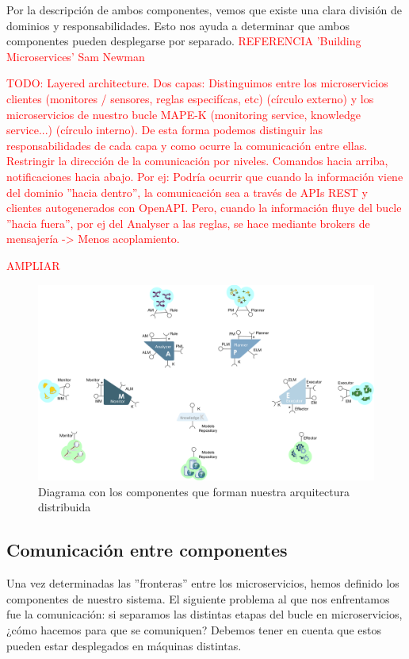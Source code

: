 Por la descripción de ambos componentes, vemos que existe una clara división de dominios y responsabilidades. Esto nos ayuda a determinar que ambos componentes pueden desplegarse por separado. \textcolor{red}{REFERENCIA 'Building Microservices' Sam Newman}

\textcolor{red}{TODO: Layered architecture. Dos capas: Distinguimos entre los microservicios clientes (monitores / sensores, reglas especifícas, etc) (círculo externo) y los microservicios de nuestro bucle MAPE-K (monitoring service, knowledge service...) (círculo interno). De esta forma podemos distinguir las responsabilidades de cada capa y como ocurre la comunicación entre ellas. Restringir la dirección de la comunicación por niveles. Comandos hacia arriba, notificaciones hacia abajo. Por ej: Podría ocurrir que cuando la información viene del dominio ''hacia dentro'', la comunicación sea a través de APIs REST y clientes autogenerados con OpenAPI. Pero, cuando la información fluye del bucle ''hacia fuera'', por ej del Analyser a las reglas, se hace mediante brokers de mensajería -> Menos acoplamiento.}

\textcolor{red}{AMPLIAR}

\begin{figure}[h]
  \centering
  \includegraphics[scale=0.3]{02_arquitectura/images/mape-k-microservices}
  \caption{Diagrama con los componentes que forman nuestra arquitectura distribuida}
  \label{fig:mape-k-microservices}
\end{figure}

\subsection{Comunicación entre componentes}

Una vez determinadas las ''fronteras'' entre los microservicios, hemos definido los componentes de nuestro sistema. El siguiente problema al que nos enfrentamos fue la comunicación: si separamos las distintas etapas del bucle en microservicios, ¿cómo hacemos para que se comuniquen? Debemos tener en cuenta que estos pueden estar desplegados en máquinas distintas.

